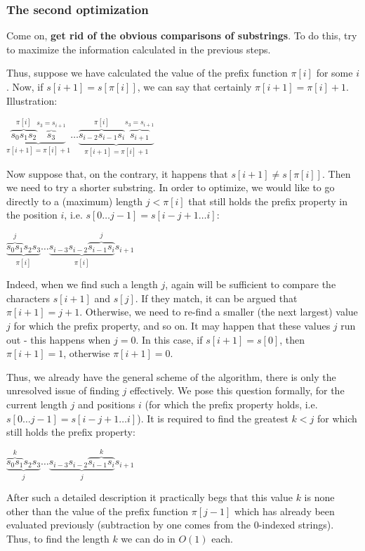 \subsubsection{ The second optimization }

Come on, \textbf{get rid of the obvious comparisons of substrings}. To do this, try to maximize the information calculated in the previous steps.

Thus, suppose we have calculated the value of the prefix function $\pi [i]$ for some $i$. Now, if $s [i +1] = s [\pi [i]]$, we can say that certainly $\pi [i +1] = \pi [i] + 1$. Illustration:

$\underbrace {\overbrace {s_0 s_1 s_2} ^ {\pi [i]} \overbrace {s_3} ^ {s_3 = s_{i+1}}} _ {\pi [i+1] = \pi[i]+1} \ldots    \underbrace{\overbrace {s_{i-2} s_{i-1} s_i} ^ {\pi [i]}  \overbrace{s_{i+1}} ^ {s_3 = s_{i+1}}} _ {\pi [i+1] = \pi[i]+1}$

Now suppose that, on the contrary, it happens that $s [i +1] \ne s [\pi [i]]$. Then we need to try a shorter substring. In order to optimize, we would like to go directly to a (maximum) length $j <\pi [i]$ that still holds the prefix property in the position $i$, i.e. $s [0 \ldots j-1] = s [i-j +1 \ldots i]$:

$\underbrace {\overbrace {s_0 s_1} ^ {j} s_2 s_3} _ {\pi [i]} \ldots    \underbrace{s_{i-3} s_{i-2} \overbrace {s_{i-1} s_i} ^ {j}}  _ {\pi [i]} s_{i+1}$

Indeed, when we find such a length $j$, again will be sufficient to compare the characters $s [i +1]$ and $s [j]$. If they match, it can be argued that $\pi [i +1] = j +1$. Otherwise, we need to re-find a smaller (the next largest) value $j$ for which the prefix property, and so on. It may happen that these values $j$ run out - this happens when $j = 0$. In this case, if $s [i +1] = s [0]$, then $\pi [i +1] = 1$, otherwise $\pi [i +1] = 0$.

Thus, we already have the general scheme of the algorithm, there is only the unresolved issue of finding $j$ effectively. We pose this question formally, for the current length $j$ and positions $i$ (for which the prefix property holds, i.e. $s [0 \ldots j-1] = s [i-j +1 \ldots i]$). It is required to find the greatest $k <j$ for which still holds the prefix property:

$\underbrace {\overbrace {s_0 s_1} ^ {k} s_2 s_3} _ {j} \ldots    \underbrace{s_{i-3} s_{i-2} \overbrace {s_{i-1} s_i} ^ {k}}  _ {j} s_{i+1}$

After such a detailed description it practically begs that this value $k$ is none other than the value of the prefix function $\pi [j-1]$ which has already been evaluated previously (subtraction by one comes from the 0-indexed strings). Thus, to find the length $k$ we can do in $O (1)$ each.

